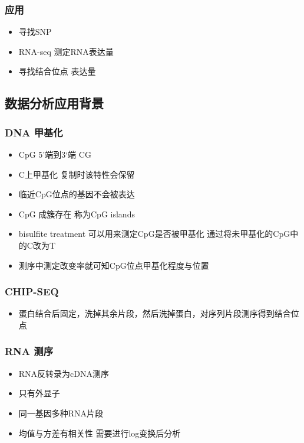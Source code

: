 \documentclass[]{book}
\providecommand{\tightlist}{%
  \setlength{\itemsep}{0pt}\setlength{\parskip}{0pt}}
\begin{document}
\hypertarget{-2}{%
\subsubsection{应用}\label{-2}}

\begin{itemize}
\tightlist
\item
  寻找SNP
\item
  RNA-seq 测定RNA表达量
\item
  寻找结合位点 表达量
\end{itemize}

\subsection{数据分析应用背景}

\hypertarget{dna-}{%
\subsubsection{DNA 甲基化}\label{dna-}}

\begin{itemize}
\tightlist
\item
  CpG 5'端到3`端 CG
\item
  C上甲基化 复制时该特性会保留
\item
  临近CpG位点的基因不会被表达
\item
  CpG 成簇存在 称为CpG islands
\item
  bisulfite treatment 可以用来测定CpG是否被甲基化 通过将未甲基化的CpG中的C改为T
\item
  测序中测定改变率就可知CpG位点甲基化程度与位置
\end{itemize}

\hypertarget{chip-seq}{%
\subsubsection{CHIP-SEQ}\label{chip-seq}}

\begin{itemize}
\tightlist
\item
  蛋白结合后固定，洗掉其余片段，然后洗掉蛋白，对序列片段测序得到结合位点
\end{itemize}

\hypertarget{rna-}{%
\subsubsection{RNA 测序}\label{rna-}}

\begin{itemize}
\tightlist
\item
  RNA反转录为cDNA测序
\item
  只有外显子
\item
  同一基因多种RNA片段
\item
  均值与方差有相关性 需要进行log变换后分析
\end{itemize}
\end{document}

